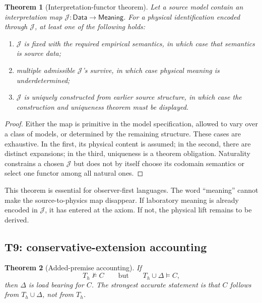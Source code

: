 \documentclass[10pt,a4paper]{article}
\newtheorem{theorem}{Theorem}[section]
\theoremstyle{definition}
\theoremstyle{remark}
\newcommand{\notmodels}{\mathrel{\not\models}}
\begin{document}
\begin{theorem}[Interpretation-functor theorem]
\label{thm:interpretationfork}
Let a source model contain an interpretation map
\(\mathcal J:\mathsf{Data}\to\mathsf{Meaning}\).  For a physical
identification encoded through \(\mathcal J\), at least one of the following
holds:
\begin{enumerate}[label=(\alph*)]
\item \(\mathcal J\) is fixed with the required empirical semantics, in which
case that semantics is source data;
\item multiple admissible \(\mathcal J\)'s survive, in which case physical
meaning is underdetermined;
\item \(\mathcal J\) is uniquely constructed from earlier source structure,
in which case the construction and uniqueness theorem must be displayed.
\end{enumerate}
\end{theorem}

\begin{proof}
Either the map is primitive in the model specification, allowed to vary over a
class of models, or determined by the remaining structure.  These cases are
exhaustive.  In the first, its physical content is assumed; in the second,
there are distinct expansions; in the third, uniqueness is a theorem
obligation.  Naturality constrains a chosen \(\mathcal J\) but does not by
itself choose its codomain semantics or select one functor among all natural
ones.
\end{proof}

This theorem is essential for observer-first languages.  The word ``meaning''
cannot make the source-to-physics map disappear.  If laboratory meaning is
already encoded in \(\mathcal J\), it has entered at the axiom.  If not, the
physical lift remains to be derived.

\subsection{T9: conservative-extension accounting}

\begin{theorem}[Added-premise accounting]
\label{thm:addedpremise}
If
\[
T_h\notmodels C
\qquad\text{but}\qquad
T_h\cup\Delta\models C,
\]
then \(\Delta\) is load bearing for \(C\).  The strongest accurate statement
is that \(C\) follows from \(T_h\cup\Delta\), not from \(T_h\).
\end{theorem}
\end{document}
